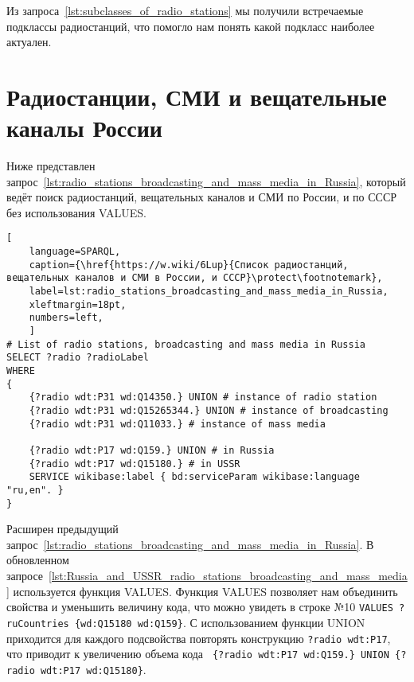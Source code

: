 Из запроса~\ref{lst:subclasses_of_radio_stations} мы получили встречаемые подклассы радиостанций, что помогло нам понять какой подкласс наиболее актуален. 

\newpage

\section{Радиостанции, СМИ и вещательные каналы России}

Ниже представлен запрос~\ref{lst:radio_stations_broadcasting_and_mass_media_in_Russia}, который ведёт поиск радиостанций, вещательных каналов и СМИ по России, и по СССР без использования VALUES.

\begin{lstlisting}[ 
    language=SPARQL,
    caption={\href{https://w.wiki/6Lup}{Список радиостанций, вещательных каналов и СМИ в России, и СССР}\protect\footnotemark},
    label=lst:radio_stations_broadcasting_and_mass_media_in_Russia,
    xleftmargin=18pt,
    numbers=left,
    ]
# List of radio stations, broadcasting and mass media in Russia 
SELECT ?radio ?radioLabel
WHERE
{
    {?radio wdt:P31 wd:Q14350.} UNION # instance of radio station
    {?radio wdt:P31 wd:Q15265344.} UNION # instance of broadcasting
    {?radio wdt:P31 wd:Q11033.} # instance of mass media
    
    {?radio wdt:P17 wd:Q159.} UNION # in Russia
    {?radio wdt:P17 wd:Q15180.} # in USSR
    SERVICE wikibase:label { bd:serviceParam wikibase:language "ru,en". }
}\end{lstlisting}%


\newpage

Расширен предыдущий запрос~\ref{lst:radio_stations_broadcasting_and_mass_media_in_Russia}. В обновленном запросе~\ref{lst:Russia_and_USSR_radio_stations_broadcasting_and_mass_media} используется функция VALUES.  Функция VALUES позволяет нам объединить свойства и уменьшить величину кода, что можно увидеть в строке №10 \lstinline|VALUES ?ruCountries {wd:Q15180 wd:Q159}|. С использованием функции UNION приходится для каждого подсвойства повторять конструкцию \lstinline|?radio wdt:P17|, что приводит к увеличению объема кода \lstinline| {?radio wdt:P17 wd:Q159.} UNION {?radio wdt:P17 wd:Q15180}|.

